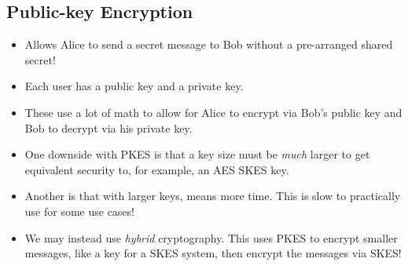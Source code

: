\documentclass{article}
\begin{document}
\subsection{Public-key Encryption}
\begin{itemize}
    \item Allows Alice to send a secret message to Bob without a pre-arranged shared secret!
    \item Each user has a public key and a private key.
    \item These use a lot of math to allow for Alice to encrypt via Bob's public key and Bob to decrypt via his private key. 
    \item One downside with PKES is that a key size must be \emph{much} larger to get equivalent security to, for example, an AES SKES key.
    \item Another is that with larger keys, means more time.  This is slow to practically use for some use cases!
    \item We may instead use \emph{hybrid} cryptography.  This uses PKES to encrypt smaller messages, like a key for a SKES system, then encrypt the messages via SKES!
\end{itemize}
\end{document}
